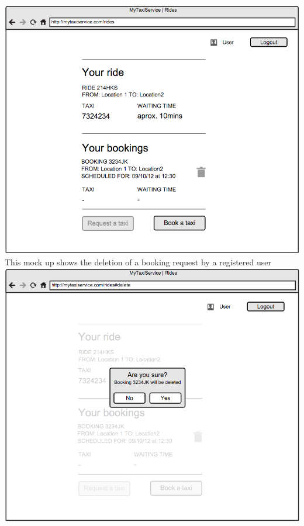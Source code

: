 \documentclass[11pt,titlepage]{article} %
\begin{document}
        \includegraphics[scale=0.52]{viewReqBookPage.png}\newline
        \newpage
        \noindent
        This mock up shows the deletion of a booking request by a registered user\newline
        \newline
        \includegraphics[scale=0.52]{deleteBookInt.png}\newline
        \newline
        
\end{document}

